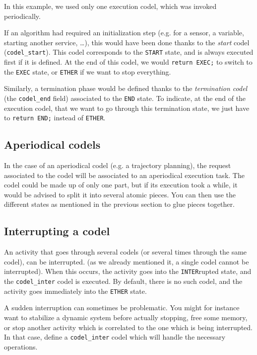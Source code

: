 In this example,   we used only  one execution  codel, which  was invoked
periodically.

If an algorithm had required an  initialization step (e.g.  for a sensor,
a variable, starting another service, \ldots), this  would have been done
thanks to the \emph{start} codel (\texttt{codel\_start}).  This codel
corresponds to the \texttt{START} state, and  is always executed first if it
is  defined. At the  end  of this codel,  we  would \texttt{return EXEC;} to
switch to  the \texttt{EXEC} state, or   \texttt{ETHER} if   we  want to  stop
everything.

Similarly, a termination phase   would be defined   thanks to the  {\em
termination codel} (the \texttt{codel\_end} field) associated to the
\texttt{END} state. To indicate, at the end of  the execution codel, that we
want to go through this  termination state, we just  have to \texttt{return
END;} instead of \texttt{ETHER}.


\subsection{Aperiodical codels}

In  the case of  an aperiodical codel (e.g.   a trajectory planning), the
request associated  to the codel  will be  associated to  an  aperiodical
execution task. The codel  could be made up of  only one part, but if its
execution took  a while,  it  would be advised  to  split it into several
atomic pieces.  You can then use the different states as mentioned in the
previous section to glue pieces together.


\subsection{Interrupting a codel}

An activity that  goes through several  codels (or  several times through
the  same codel), can  be  interrupted.  (as  we already  mentioned it, a
single codel cannot be interrupted). When  this occurs, the activity goes
into the  \texttt{INTER}rupted  state,  and the  \texttt{codel\_inter}
codel is executed.  By default, there is  no such codel, and the activity
goes immediately into the \texttt{ETHER} state.

A  sudden  interruption can   sometimes  be problematic.  You  might  for
instance  want  to stabilize a dynamic   system before actually stopping,
free some memory, or stop another activity which is correlated to the one
which   is  being     interrupted.  In   that  case,   define    a
\texttt{codel\_inter} codel which will handle the necessary operations.


